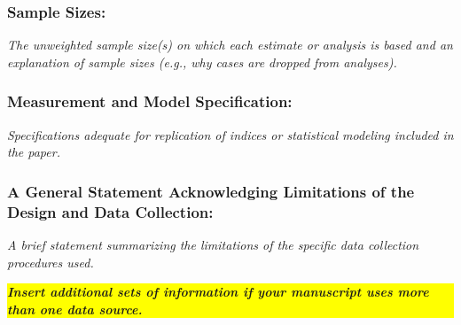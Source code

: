 \documentclass{article}
\begin{document}
\subsubsection*{Sample Sizes:} \textit{The unweighted sample size(s) on which
    each estimate or analysis is based and an explanation of sample sizes (e.g.,
    why cases are dropped from analyses).}

\subsubsection*{Measurement and Model Specification:} \textit{Specifications
    adequate for replication of indices or statistical modeling included in the
    paper.}

\subsubsection*{A General Statement Acknowledging Limitations of the Design and
    Data Collection:} \textit{A brief statement summarizing the limitations of the
    specific data collection procedures used.}

\medskip

\colorbox{yellow}{\parbox[l]{.92 \textwidth}{
        \bfseries \textit{
            Insert additional sets of information if your manuscript uses more than one
            data source.
        }}}
\end{document}
